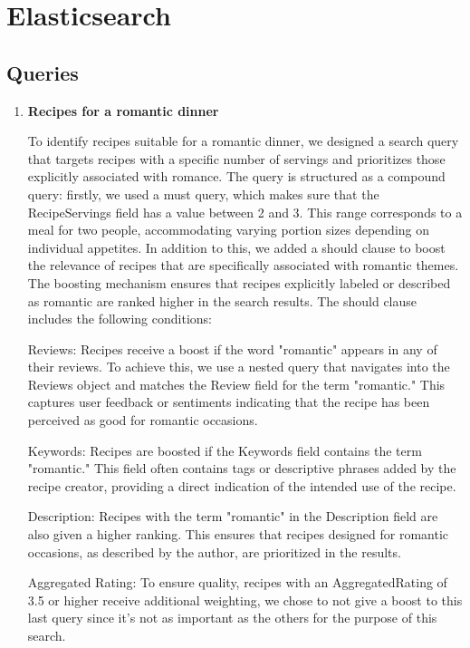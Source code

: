 \section{Elasticsearch}

\subsection{Queries}
\begin{enumerate}
    \item \textbf{Recipes for a romantic dinner}

    To identify recipes suitable for a romantic dinner, we designed a search query that targets recipes with a specific number of servings and prioritizes those explicitly associated with romance. 
    The query is structured as a compound query: firstly, we used a must query, which makes sure that the RecipeServings field has a value between 2 and 3. This range corresponds to a meal for two people, accommodating varying portion sizes depending on individual appetites.
    In addition to this, we added a should clause to boost the relevance of recipes that are specifically associated with romantic themes. The boosting mechanism ensures that recipes explicitly labeled or described as romantic are ranked higher in the search results. The should clause includes the following conditions:
    
    Reviews: Recipes receive a boost if the word "romantic" appears in any of their reviews. To achieve this, we use a nested query that navigates into the Reviews object and matches the Review field for the term "romantic." This captures user feedback or sentiments indicating that the recipe has been perceived as good for romantic occasions.

    Keywords: Recipes are boosted if the Keywords field contains the term "romantic." This field often contains tags or descriptive phrases added by the recipe creator, providing a direct indication of the intended use of the recipe.

    Description: Recipes with the term "romantic" in the Description field are also given a higher ranking. This ensures that recipes designed for romantic occasions, as described by the author, are prioritized in the results.

    Aggregated Rating: To ensure quality, recipes with an AggregatedRating of 3.5 or higher receive additional weighting, we chose to not give a boost to this last query since it's not as important as the others for the purpose of this search.


\end{enumerate}
